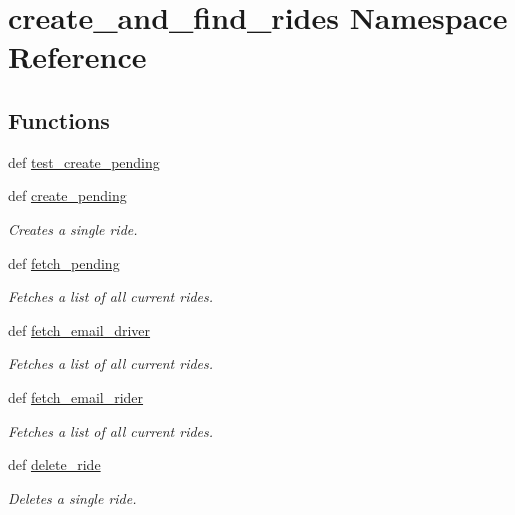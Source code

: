 \hypertarget{namespacecreate__and__find__rides}{\section{create\-\_\-and\-\_\-find\-\_\-rides Namespace Reference}
\label{namespacecreate__and__find__rides}
}
\subsection*{Functions}
\begin{DoxyCompactItemize}
\item 
def \hyperlink{namespacecreate__and__find__rides_a070f71776ce558d1b57a72ee0720fe2e}{test\-\_\-create\-\_\-pending}
\item 
def \hyperlink{namespacecreate__and__find__rides_a7968cb251a6c9fcec8a3ca5269201d77}{create\-\_\-pending}
\begin{DoxyCompactList}\small\item\em Creates a single ride. \end{DoxyCompactList}\item 
def \hyperlink{namespacecreate__and__find__rides_aa33ddd45e27b015236a6029d6860808c}{fetch\-\_\-pending}
\begin{DoxyCompactList}\small\item\em Fetches a list of all current rides. \end{DoxyCompactList}\item 
def \hyperlink{namespacecreate__and__find__rides_a06255e29766f0847ebe3b0a89bd8e8cb}{fetch\-\_\-email\-\_\-driver}
\begin{DoxyCompactList}\small\item\em Fetches a list of all current rides. \end{DoxyCompactList}\item 
def \hyperlink{namespacecreate__and__find__rides_af630a8153e1b79e0defb1cc67965c68f}{fetch\-\_\-email\-\_\-rider}
\begin{DoxyCompactList}\small\item\em Fetches a list of all current rides. \end{DoxyCompactList}\item 
def \hyperlink{namespacecreate__and__find__rides_a691898eed45d5b5d830047b911ecdd64}{delete\-\_\-ride}
\begin{DoxyCompactList}\small\item\em Deletes a single ride. \end{DoxyCompactList}\end{DoxyCompactItemize}


